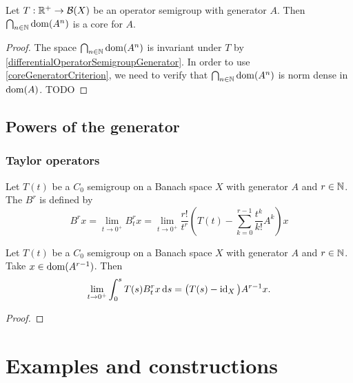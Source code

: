 \begin{proposition} \label{domAinftyCore}
Let $T: \mathbb{R}^+\to \operatorname{\mathcal{B}}(X)$ be an operator semigroup with generator $A$. Then $\bigcap_{n\in\mathbb{N}}\operatorname{dom}(A^n)$ is a core for $A$.
\end{proposition}
\begin{proof}
The space $\bigcap_{n\in\mathbb{N}}\operatorname{dom}(A^n)$ is invariant under $T$ by \ref{differentialOperatorSemigroupGenerator}. In order to use \ref{coreGeneratorCriterion}, we need to verify that $\bigcap_{n\in\mathbb{N}}\operatorname{dom}(A^n)$ is norm dense in $\operatorname{dom} (A)$. TODO
\end{proof}

\subsection{Powers of the generator}
\subsubsection{Taylor operators}
\begin{definition}
Let $T(t)$ be a $C_0$ semigroup on a Banach space $X$ with generator $A$ and $r\in \mathbb{N}$. The  $B^r$ is defined by
\[ B^rx = \lim_{t\to 0^+}B_t^rx = \lim_{t\to 0^+}\frac{r!}{t^r}\left(T(t) - \sum^{r-1}_{k=0}\frac{t^k}{k!}A^k\right)x \]
\end{definition}

\begin{lemma}
Let $T(t)$ be a $C_0$ semigroup on a Banach space $X$ with generator $A$ and $r\in \mathbb{N}$. Take $x\in\operatorname{dom}(A^{r-1})$. Then
\[ \lim_{t\to 0^+} \int_0^s T(s)B_t^r x \operatorname{d \!}{s} = \big(T(s)-\operatorname{id}_X\big)A^{r-1}x. \]
\end{lemma}
\begin{proof}

\end{proof}

\section{Examples and constructions}
